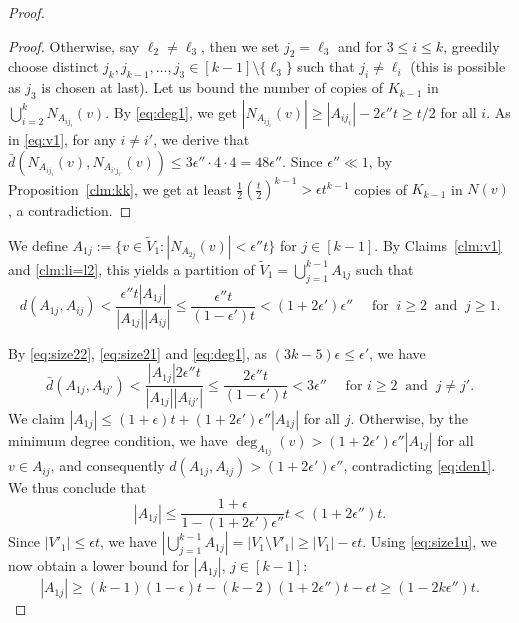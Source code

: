 \documentclass[reqno]{amsart}
\theoremstyle{plain}
\def\eps{\epsilon}
\begin{document}
\begin{proof}
\begin{proof}
Otherwise, say $\ell_2\ne \ell_3$, then we set $j_2 = \ell_3$ and for $3\le i\le k$, greedily choose distinct $j_k, j_{k-1}, \dots, j_3\in [k-1]\setminus \{\ell_3\}$ such that $j_i\neq \ell_i$ (this is possible as $j_3$ is chosen at last). Let us bound the number of copies of $K_{k-1}$ in $\bigcup_{i=2}^{k} N_{A_{i j_i}}(v)$.
By \ref{eq:deg1}, we get $|N_{A_{i j_i}}(v)|\ge |A_{i j_i}| - 2 \eps'' t \ge t/2$ for all $i$.  As in \eqref{eq:v1}, for any $i\neq i'$, we derive that $\bar d(N_{A_{ij_i}}(v), N_{A_{i'j_{i'}}}(v)) \le 3\eps'' \cdot4\cdot 4 = 48\eps''$.
Since $\eps'' \ll 1$, by Proposition~\ref{clm:kk}, we get at least $\frac12 \left( \frac t2  \right)^{k-1} > \eps t^{k-1}$ copies of $K_{k-1}$ in $N(v)$, a contradiction.
\end{proof}

We define $A_{1j} := \{v\in \tilde V_1: |N_{A_{2j}}(v)|< \eps'' t \}$ for $j\in [k-1]$.
By Claims~\ref{clm:v1} and \ref{clm:li=l2}, this yields a partition of $\tilde V_1 = \bigcup_{j=1}^{k-1} A_{1j}$ such that
\begin{equation}\label{eq:den1}
d(A_{1j}, A_{ij})< \frac{\eps''t |A_{1j}|}{|A_{1j}||A_{ij}|} \le\frac{\eps''t}{(1 - \eps')t} < (1+2\eps') \eps'' \quad \text{ for } \ i\ge 2  \ \text{ and } \ j\ge 1.
\end{equation}

By \eqref{eq:size22}, \eqref{eq:size21} and \eqref{eq:deg1}, as $(3k-5)\eps \le \eps'$, we have
\begin{equation}\label{eq:den1dia}
\bar d(A_{1j}, A_{ij'})<\frac {|A_{1j}| 2\eps'' t }{|A_{1j}||A_{ij'}|}\le \frac {2\eps'' t} {(1-\eps')t} < 3\eps'' \quad \text{ for } i\ge 2 \ \text{ and } \ j\neq j'.
\end{equation}
We claim $|A_{1j}| \le (1+ \eps)t + (1+ 2\eps') \eps''|A_{1j}|$ for all $j$. Otherwise, by the minimum degree condition, we have $\deg_{A_{1j}} (v)> (1+2\eps') \eps'' |A_{1j}|$ for all $v\in A_{ij}$, and consequently $d(A_{1j},A_{ij}) > (1+2\eps') \eps''$, contradicting \eqref{eq:den1}. We thus conclude that
\begin{equation}\label {eq:size1u}
|A_{1j}|\le \frac{1+\eps}{1- (1+2\eps') \eps''} t< (1+ 2\epsilon'' )t.
\end{equation}
Since $|V'_1|\le \eps t$, we have $|\bigcup_{j=1}^{k-1} A_{1j}| = |V_1\setminus V'_1| \ge |V_1| - \eps t$. Using \eqref{eq:size1u}, we now obtain a lower bound for $|A_{1j}|$, $j\in[k-1]$:
\begin{equation}\label {eq:size1l}
|A_{1j}| \ge (k-1)(1-\epsilon)t - (k-2)(1+2\epsilon'' )t - \epsilon t \ge (1- 2k\epsilon'') t.
\end{equation}


\end{proof}
\end{document}
